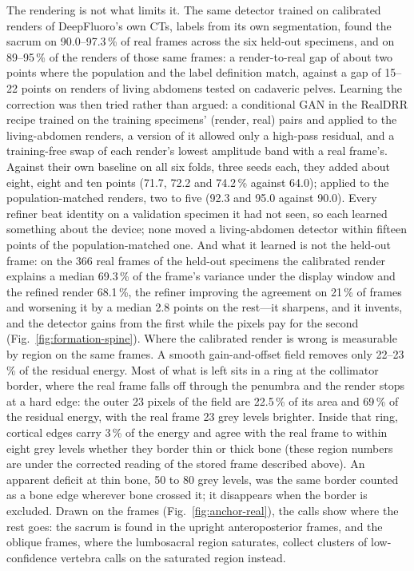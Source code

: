 \documentclass[11pt,letterpaper]{article}
\begin{document}
The rendering is not what limits it. The same detector trained on calibrated renders of DeepFluoro's own
CTs, labels from its own segmentation, found the sacrum on 90.0--97.3\,\% of real frames across the six
held-out specimens, and on 89--95\,\% of the renders of those same frames: a render-to-real gap of about
two points where the population and the label definition match, against a gap of 15--22 points on renders of
living abdomens tested on cadaveric pelves. Learning the correction was then tried rather than argued: a
conditional GAN in the RealDRR recipe trained on the training specimens' (render, real) pairs and applied to
the living-abdomen renders, a version of it allowed only a high-pass residual, and a training-free swap of
each render's lowest amplitude band with a real frame's. Against their own baseline on all six folds, three
seeds each, they added about eight, eight and ten points (71.7, 72.2 and 74.2\,\% against 64.0); applied to
the population-matched renders, two to five (92.3 and 95.0 against 90.0).
Every refiner beat identity on a validation specimen it had not seen, so each learned something about the
device; none moved a living-abdomen detector within fifteen points of the population-matched one. And what
it learned is not the held-out frame: on the 366 real frames of the held-out specimens the calibrated render
explains a median 69.3\,\% of the frame's variance under the display window and the refined render
68.1\,\%, the refiner improving the agreement on 21\,\% of frames and worsening it by a median 2.8 points on
the rest---it sharpens, and it invents, and the detector gains from the first while the pixels pay for the
second (Fig.~\ref{fig:formation-spine}). Where the calibrated render is wrong is measurable by region on
the same frames. A smooth gain-and-offset field removes only 22--23\,\% of the residual energy. Most of what
is left sits in a ring at the collimator border, where the real frame falls off through the penumbra and the
render stops at a hard edge: the outer 23 pixels of the field are 22.5\,\% of its area and 69\,\% of the
residual energy, with the real frame 23 grey levels brighter. Inside that ring, cortical edges carry 3\,\% of
the energy and agree with the real frame to within eight grey levels whether they border thin or thick bone
(these region numbers are under the corrected reading of the stored frame described above). An
apparent deficit at thin bone, 50 to 80 grey levels, was the same border counted as a bone edge wherever bone
crossed it; it disappears when the border is excluded. Drawn on
the frames (Fig.~\ref{fig:anchor-real}), the calls show where the rest goes: the sacrum is found in the
upright anteroposterior frames, and the oblique frames, where the lumbosacral region saturates, collect
clusters of low-confidence vertebra calls on the saturated region instead.
\end{document}
